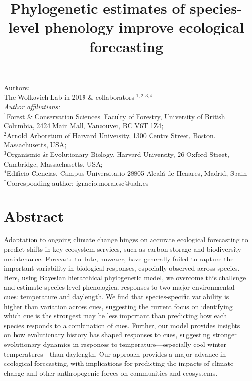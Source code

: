 \documentclass[11pt]{article}
\title{Phylogenetic estimates of species-level phenology improve ecological forecasting}
\def\labelitemi{--}
\begin{document}



\maketitle

\noindent Authors:\\
The Wolkovich Lab in 2019 \& collaborators $^{1,2,3,4}$ %
\vspace{2ex}\\
\emph{Author affiliations:}\\
$^{1}$Forest \& Conservation Sciences, Faculty of Forestry, University of British Columbia, 2424 Main Mall, Vancouver, BC V6T 1Z4;\\
$^{2}$Arnold Arboretum of Harvard University, 1300 Centre Street, Boston, Massachusetts, USA;\\
$^{3}$Organismic \& Evolutionary Biology, Harvard University, 26 Oxford Street, Cambridge, Massachusetts, USA;\\
$^{4}$Edificio Ciencias, Campus Universitario 28805 Alcalá de Henares, Madrid, Spain\\
 

\vspace{2ex}
$^*$Corresponding author: ignacio.moralesc@uah.es\\
\renewcommand{\thetable}{\arabic{table}}
\renewcommand{\thefigure}{\arabic{figure}}
\renewcommand{\labelitemi}{$-$}

\clearpage




\section*{Abstract}
Adaptation to ongoing climate change hinges on accurate ecological forecasting to predict shifts in key ecosystem services, such as carbon storage and biodiversity maintenance. Forecasts to date, however, have generally failed to capture the important variability in biological responses, especially observed across species.  Here, using Bayesian hierarchical phylogenetic model, we overcome this challenge and estimate species-level phenological responses to two major environmental cues: temperature and daylength. We find that species-specific variability is higher than variation across cues, suggesting the current focus on identifying which cue is the strongest may be less important than predicting how each species responds to a combination of cues. Further, our model provides insights on how evolutionary history has shaped responses to cues, suggesting stronger evolutionary dynamics in responses to temperature---especially cool winter temperatures---than daylength. Our approach provides a major advance in ecological forecasting, with implications for predicting the impacts of climate change and other anthropogenic forces on communities and ecosystems. 
\clearpage
\end{document}
